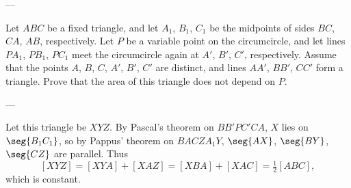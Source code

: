 
---

Let $ABC$ be a fixed triangle, and let $A_1$, $B_1$, $C_1$ be the midpoints of sides $BC$, $CA$, $AB$, respectively. Let $P$ be a variable point on the circumcircle, and let lines $PA_1$, $PB_1$, $PC_1$ meet the circumcircle again at $A'$, $B'$, $C'$, respectively. Assume that the points $A$, $B$, $C$, $A'$, $B'$, $C'$ are distinct, and lines $AA'$, $BB'$, $CC'$ form a triangle. Prove that the area of this triangle does not depend on $P$.

---

Let this triangle be $XYZ$. By Pascal's theorem on $BB'PC'CA$, $X$ lies on $\seg{B_1C_1}$, so by Pappus' theorem on $BACZA_1Y$, $\seg{AX}$, $\seg{BY}$, $\seg{CZ}$ are parallel. Thus \[ [XYZ]=[XYA]+[XAZ]=[XBA]+[XAC]=\tfrac12[ABC],\]
which is constant.

